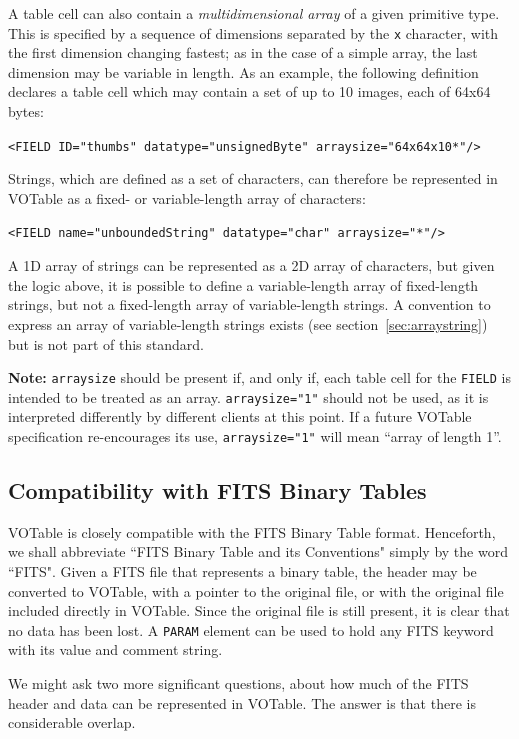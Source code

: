 \documentclass[11pt,a4paper]{ivoa}
\def\Aref#1{section~\ref{#1}}
\let\fg=\color
\def\slash {{\fg{blue}/}}
\def\attr#1{{\tt{\fg{DarkRed}#1}}}
\def\elem#1{{\tt{\fg{DarkRed}#1}}}
\def\attrval#1#2{{\tt{\fg{DarkRed}#1}="{\fg{DarkPurple}#2}"}}
\def\elemdef#1#2{{\tt\fg{blue}<}{\tt{\fg{DarkRed}#1}#2}{\tt\fg{blue}>}}
\begin{document}
A table cell can also contain a {\em multidimensional array}
of a given primitive type. This is specified by a sequence of dimensions
separated by the {\tt x} character,
with the first dimension changing fastest; as in the case
of a simple array, the last dimension may be variable in length.
As an example, the following definition
declares a table cell which may contain a set of up to 10 images,
each of 64x64 bytes:

\elemdef{FIELD}{ \attrval{ID}{thumbs} \attrval{datatype}{unsignedByte}
  \attrval{arraysize}{64x64x10*}\slash}

Strings, which are defined as a set of characters,
can therefore be represented in VOTable as a fixed- or variable-length
array of characters:

\elemdef{FIELD}{ \attrval{name}{unboundedString} \attrval{datatype}{char}
       \attrval{arraysize}{*}\slash}

A 1D array of strings can be represented as a 2D array of characters, but
given the logic above, it is possible to define a variable-length array
of fixed-length strings,
but not a fixed-length array of variable-length strings.
A convention to express an array of variable-length strings
exists (see \Aref{sec:arraystring}) but is not
part of this standard.

\textbf{Note:} \attr{arraysize} should be present if, and only if, each table
cell for the \elem{FIELD} is intended to be treated as an array.
\attrval{arraysize}{1}
should not be used, as it is interpreted differently by different
clients at this point. If a future VOTable specification re-encourages
its use, \attrval{arraysize}{1} will mean ``array of length 1''.

\subsection{Compatibility with FITS Binary Tables}

VOTable is closely compatible with the FITS Binary Table format.
Henceforth, we shall abbreviate ``FITS Binary Table  and its
Conventions" simply by the word ``FITS". Given a FITS
file that represents a binary table, the header may be converted to
VOTable, with a pointer to the original file, or with the original
file included directly in VOTable. Since the original file is still
present, it is clear that no data has been lost. A {\elem{PARAM}}
element can be used to hold any FITS keyword with its value
and comment string.

We might ask two more significant questions, about how much of
the FITS header and data can be represented in VOTable. The answer is
that there is considerable overlap.
\end{document}
